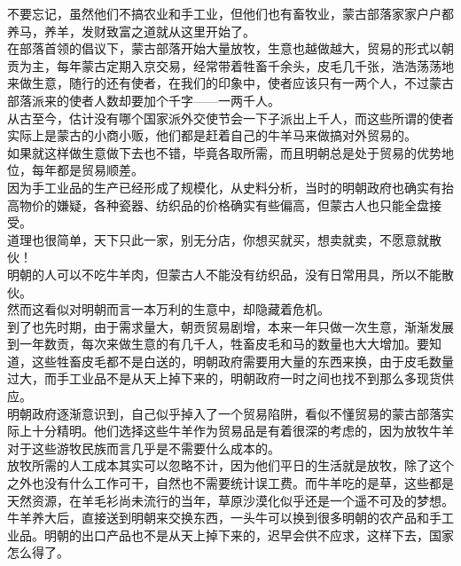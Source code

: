 \begin{multicols}{\theparacolNo}
不要忘记，虽然他们不搞农业和手工业，但他们也有畜牧业，蒙古部落家家户户都养马，养羊，发财致富之道就从这里开始了。\\

在部落首领的倡议下，蒙古部落开始大量放牧，生意也越做越大，贸易的形式以朝贡为主，每年蒙古定期入京交易，经常带着牲畜千余头，皮毛几千张，浩浩荡荡地来做生意，随行的还有使者，在我们的印象中，使者应该只有一两个人，不过蒙古部落派来的使者人数却要加个千字——一两千人。\\

从古至今，估计没有哪个国家派外交使节会一下子派出上千人，而这些所谓的使者实际上是蒙古的小商小贩，他们都是赶着自己的牛羊马来做搞对外贸易的。\\

如果就这样做生意做下去也不错，毕竟各取所需，而且明朝总是处于贸易的优势地位，每年都是贸易顺差。\\

因为手工业品的生产已经形成了规模化，从史料分析，当时的明朝政府也确实有抬高物价的嫌疑，各种瓷器、纺织品的价格确实有些偏高，但蒙古人也只能全盘接受。\\

道理也很简单，天下只此一家，别无分店，你想买就买，想卖就卖，不愿意就散伙！\\

明朝的人可以不吃牛羊肉，但蒙古人不能没有纺织品，没有日常用具，所以不能散伙。\\

然而这看似对明朝而言一本万利的生意中，却隐藏着危机。\\

到了也先时期，由于需求量大，朝贡贸易剧增，本来一年只做一次生意，渐渐发展到一年数贡，每次来做生意的有几千人，牲畜皮毛和马的数量也大大增加。要知道，这些牲畜皮毛都不是白送的，明朝政府需要用大量的东西来换，由于皮毛数量过大，而手工业品不是从天上掉下来的，明朝政府一时之间也找不到那么多现货供应。\\

明朝政府逐渐意识到，自己似乎掉入了一个贸易陷阱，看似不懂贸易的蒙古部落实际上十分精明。他们选择这些牛羊作为贸易品是有着很深的考虑的，因为放牧牛羊对于这些游牧民族而言几乎是不需要什么成本的。\\

放牧所需的人工成本其实可以忽略不计，因为他们平日的生活就是放牧，除了这个之外也没有什么工作可干，自然也不需要统计误工费。而牛羊吃的是草，这些都是天然资源，在羊毛衫尚未流行的当年，草原沙漠化似乎还是一个遥不可及的梦想。\\

牛羊养大后，直接送到明朝来交换东西，一头牛可以换到很多明朝的农产品和手工业品。明朝的出口产品也不是从天上掉下来的，迟早会供不应求，这样下去，国家怎么得了。\\


\end{multicols}
